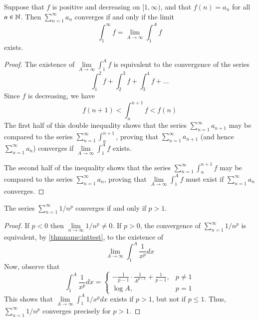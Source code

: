 \begin{namthm}\label{thmname:inttest}
    Suppose that $f$ is positive and decreasing on $[1,\infty)$, and that $f(n) = a_n$ for all $n \in \mathbb N$. Then $\sum\limits_{n=1}^{\infty}a_n$ converges if and only if the limit \begin{equation*}
        \int_1^{\infty}f = \lim\limits_{A\rightarrow \infty}\int_1^Af
    \end{equation*}
    exists.
\end{namthm}
\begin{proof}
    The existence of $\lim\limits_{A\rightarrow \infty}\int_1^Af$ is equivalent to the convergence of the series \begin{equation*}
        \int_1^2f + \int_2^3f + \int_3^4f + ...
    \end{equation*}
    Since $f$ is decreasing, we have \begin{equation*}
        f(n+1) < \int_n^{n+1}f < f(n) 
    \end{equation*}
    The first half of this double inequality shows that the series $\sum\limits_{n=1}^{\infty}a_{n+1}$ may be compared to the series $\sum\limits_{n=1}^{\infty}\int_n^{n+1}$, proving that $\sum\limits_{n=1}^{\infty}a_{n+1}$ (and hence $\sum\limits_{n=1}^{\infty}a_n$) converges if $\lim\limits_{A\rightarrow \infty}\int_1^Af$ exists.

    The second half of the inequality shows that the series $\sum\limits_{n=1}^{\infty}\int_n^{n+1}f$ may be compared to the series $\sum\limits_{n=1}^{\infty}a_n$, proving that $\lim\limits_{A\rightarrow \infty}\int_1^Af$ must exist if $\sum\limits_{n=1}^{\infty}a_n$ converges.
\end{proof}


\begin{cor}
    The series $\sum\limits_{n=1}^{\infty}1/n^p$ converges if and only if $p > 1$.
\end{cor}
\begin{proof}
    If $p < 0$ then $\lim\limits_{n\rightarrow \infty}1/n^p \neq 0$. If $p > 0$, the convergence of $\sum\limits_{n=1}^{\infty}1/n^p$ is equivalent, by \ref{thmname:inttest}, to the existence of \begin{equation*}
        \lim\limits_{A\rightarrow\infty}\int_1^A\frac{1}{x^p}dx
    \end{equation*}
    Now, observe that \begin{equation*}
        \int_1^A\frac{1}{x^p}dx = \left\{\begin{array}{lc} -\frac{1}{p-1}\cdot\frac{1}{A^{p-1}} + \frac{1}{p-1}, & p \neq 1 \\ \log A, & p = 1\end{array}\right.
    \end{equation*}
    This shows that $\lim\limits_{A\rightarrow \infty}\int_1^A1/x^pdx$ exists if $p > 1$, but not if $p \leq 1$. Thus, $\sum\limits_{n=1}^{\infty}1/n^p$ converges precisely for $p > 1$. 
\end{proof}

